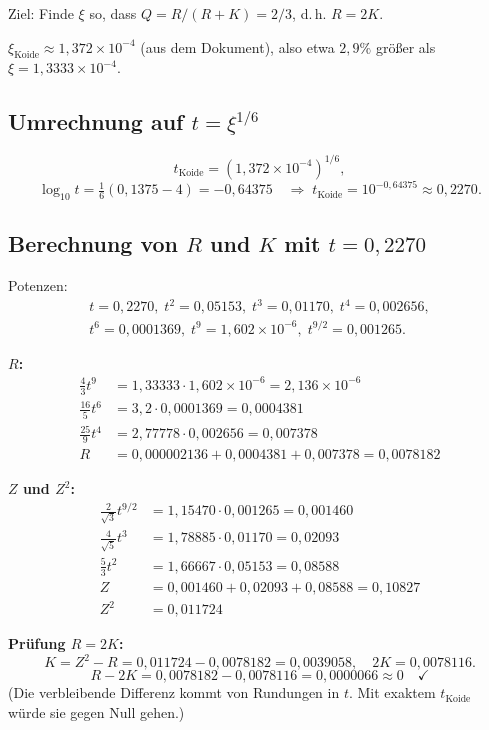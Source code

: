 Ziel: Finde $\xi$ so, dass $Q=R/(R+K)=2/3$, d.\,h. $R=2K$.

$\xi_{\text{Koide}}\approx1{,}372\times10^{-4}$ (aus dem Dokument),
also etwa $2{,}9\%$ größer als $\xi=1{,}3333\times10^{-4}$.

\subsection{Umrechnung auf $t=\xi^{1/6}$}

\[
  t_{\text{Koide}}=(1{,}372\times10^{-4})^{1/6},
\]
\[
  \log_{10}t=\tfrac{1}{6}(0{,}1375-4)=-0{,}64375
  \quad\Rightarrow\; t_{\text{Koide}}=10^{-0{,}64375}\approx0{,}2270.
\]

\subsection{Berechnung von $R$ und $K$ mit $t=0{,}2270$}

Potenzen:
\begin{align*}
  t=0{,}2270,\; t^2=0{,}05153,\; t^3=0{,}01170,\; t^4=0{,}002656, \\[2pt]
  t^6=0{,}0001369,\; t^9=1{,}602\times10^{-6},\;
  t^{9/2}=0{,}001265.
\end{align*}

\textbf{$R$:}
\begin{align*}
  \tfrac{4}{3}t^9 &= 1{,}33333\cdot1{,}602\times10^{-6}=2{,}136\times10^{-6} \\
  \tfrac{16}{5}t^6 &= 3{,}2\cdot0{,}0001369=0{,}0004381 \\
  \tfrac{25}{9}t^4 &= 2{,}77778\cdot0{,}002656=0{,}007378 \\
  R &= 0{,}000002136+0{,}0004381+0{,}007378=0{,}0078182
\end{align*}

\textbf{$Z$ und $Z^2$:}
\begin{align*}
  \tfrac{2}{\sqrt{3}}t^{9/2} &= 1{,}15470\cdot0{,}001265=0{,}001460 \\
  \tfrac{4}{\sqrt{5}}t^3 &= 1{,}78885\cdot0{,}01170=0{,}02093 \\
  \tfrac{5}{3}t^2 &= 1{,}66667\cdot0{,}05153=0{,}08588 \\
  Z &= 0{,}001460+0{,}02093+0{,}08588=0{,}10827 \\
  Z^2 &= 0{,}011724
\end{align*}

\textbf{Prüfung $R=2K$:}
\[
  K=Z^2-R=0{,}011724-0{,}0078182=0{,}0039058, \quad
  2K=0{,}0078116.
\]
\[
  R-2K = 0{,}0078182-0{,}0078116=0{,}0000066
  \approx0\quad\checkmark
\]
(Die verbleibende Differenz kommt von Rundungen in $t$.
Mit exaktem $t_{\text{Koide}}$ würde sie gegen Null gehen.)


